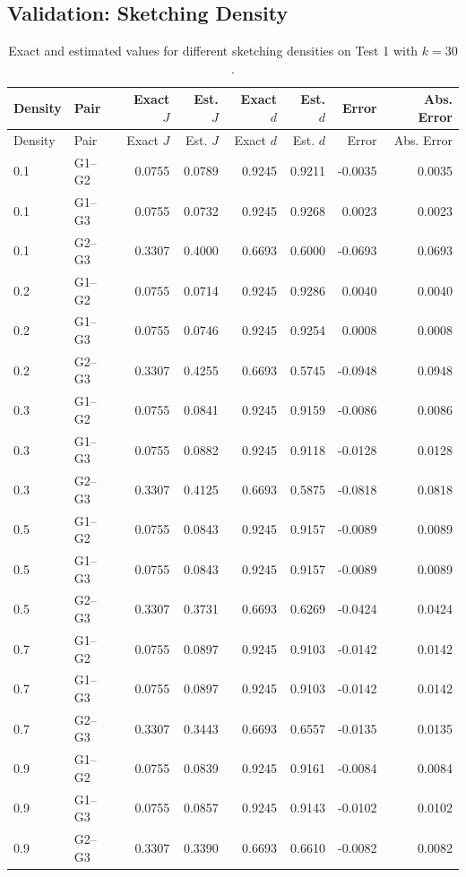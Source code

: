 \documentclass[11pt,a4paper]{article}
\begin{document}
\subsection{Validation: Sketching Density}

\begin{longtable}{llrrrrrr}
\caption{Exact and estimated values for different sketching densities on
Test 1 with $k=30$.}
\\
\toprule
Density & Pair & Exact $J$ & Est. $J$ &
Exact $d$ & Est. $d$ & Error & Abs. Error\\
\midrule
\endfirsthead

\toprule
Density & Pair & Exact $J$ & Est. $J$ &
Exact $d$ & Est. $d$ & Error & Abs. Error\\
\midrule
\endhead

0.1&G1--G2&0.0755&0.0789&0.9245&0.9211&-0.0035&0.0035\\
0.1&G1--G3&0.0755&0.0732&0.9245&0.9268&0.0023&0.0023\\
0.1&G2--G3&0.3307&0.4000&0.6693&0.6000&-0.0693&0.0693\\

0.2&G1--G2&0.0755&0.0714&0.9245&0.9286&0.0040&0.0040\\
0.2&G1--G3&0.0755&0.0746&0.9245&0.9254&0.0008&0.0008\\
0.2&G2--G3&0.3307&0.4255&0.6693&0.5745&-0.0948&0.0948\\

0.3&G1--G2&0.0755&0.0841&0.9245&0.9159&-0.0086&0.0086\\
0.3&G1--G3&0.0755&0.0882&0.9245&0.9118&-0.0128&0.0128\\
0.3&G2--G3&0.3307&0.4125&0.6693&0.5875&-0.0818&0.0818\\

0.5&G1--G2&0.0755&0.0843&0.9245&0.9157&-0.0089&0.0089\\
0.5&G1--G3&0.0755&0.0843&0.9245&0.9157&-0.0089&0.0089\\
0.5&G2--G3&0.3307&0.3731&0.6693&0.6269&-0.0424&0.0424\\

0.7&G1--G2&0.0755&0.0897&0.9245&0.9103&-0.0142&0.0142\\
0.7&G1--G3&0.0755&0.0897&0.9245&0.9103&-0.0142&0.0142\\
0.7&G2--G3&0.3307&0.3443&0.6693&0.6557&-0.0135&0.0135\\

0.9&G1--G2&0.0755&0.0839&0.9245&0.9161&-0.0084&0.0084\\
0.9&G1--G3&0.0755&0.0857&0.9245&0.9143&-0.0102&0.0102\\
0.9&G2--G3&0.3307&0.3390&0.6693&0.6610&-0.0082&0.0082\\

\bottomrule
\end{longtable}
\end{document}
